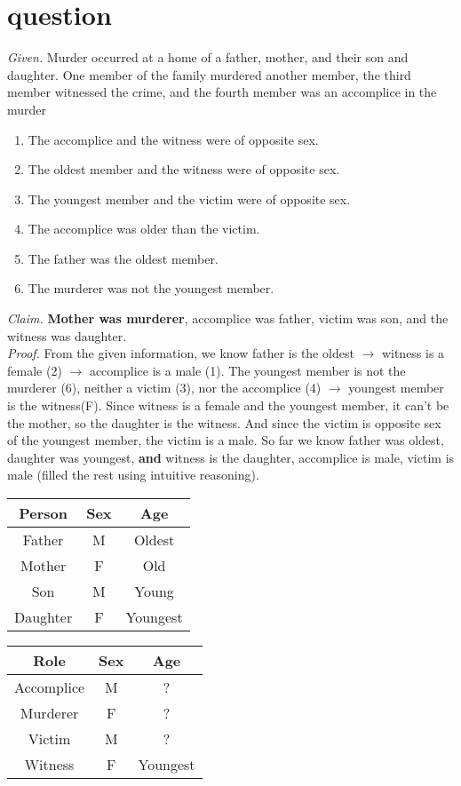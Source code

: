 \documentclass[11pt]{article}
\begin{document}

\section{question}
\emph{Given. } Murder occurred at a home of a father, mother, and their son and daughter. One member of the family murdered another member, the third member witnessed the
crime, and the fourth member was an accomplice in the murder
\begin{enumerate}
    \item The accomplice and the witness were of opposite sex.
\item The oldest member and the witness were of opposite sex.
\item The youngest member and the victim were of opposite sex.
\item The accomplice was older than the victim.
\item The father was the oldest member.
\item The murderer was not the youngest member. 
\end{enumerate} \medskip
\emph{Claim. }  \textbf{Mother was murderer}, accomplice was father, victim was son, and the witness was daughter. \medskip \\
\emph{Proof. } From the given information, we know father is the oldest $\rightarrow$ witness is a female (2) $\rightarrow$ accomplice is a male (1). 
The youngest member is not the murderer (6), neither a victim (3), nor the accomplice (4) $\rightarrow$ youngest member is the witness(F). Since witness is a female and the youngest member, it can't be the mother, so the daughter is the witness. And since the victim is opposite sex of the youngest member, the victim is a male.
So far we know father was oldest, daughter was youngest, \textbf{and} witness is the daughter, accomplice is male, victim is male (filled the rest using intuitive reasoning). \\
\begin{center}
\begin{tabular}{|c | c | c |}
 \hline
 Person & Sex & Age  \\
 \hline
  Father & M & Oldest \\
 \hline
 Mother & F & Old \\
 \hline
 Son & M & Young  \\
 \hline
 Daughter & F & Youngest  \\
 \hline
\end{tabular}
\quad
\begin{tabular}{|c | c | c |}
 \hline
 Role & Sex & Age  \\
 \hline
Accomplice & M & ? \\
 \hline
 Murderer & F & ? \\
 \hline
 Victim & M & ?  \\
 \hline
 Witness & F & Youngest  \\
 \hline
\end{tabular}
\end{center}
\end{document}
